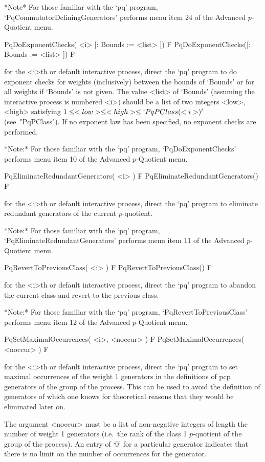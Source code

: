 \goodbreak%
*Note*
For those familiar with the `pq' program, `PqCommutatorDefiningGenerators'
performs menu item 24 of the Advanced $p$-Quotient menu.

\>PqDoExponentChecks( <i> [: Bounds := <list> ]) F
\>PqDoExponentChecks([: Bounds := <list> ]) F

for the  <i>th or  default interactive {\ANUPQ}  process, direct  the `pq'
program to do exponent checks for weights (inclusively) between the bounds
of `Bounds' or for all weights  if `Bounds' is not given. The value <list>
of `Bounds' (assuming the interactive process is numbered <i>) should be a
list of two integers <low>, <high>  satisfying $1 \le <low> \le <high> \le
`PqPClass(<i>)'$ (see~"PqPClass").  If no exponent law has been specified,
no exponent checks are performed.

*Note:*
For those familiar with the `pq'  program,  `PqDoExponentChecks'  performs
menu item 10 of the Advanced $p$-Quotient menu.

\>PqEliminateRedundantGenerators( <i> ) F
\>PqEliminateRedundantGenerators() F

for the <i>th or default interactive {\ANUPQ} process, direct  the  `pq'
program to eliminate redundant generators of the current $p$-quotient.

*Note:* 
For those familiar with the `pq' program, `PqEliminateRedundantGenerators'
performs menu item 11 of the Advanced $p$-Quotient menu.

\>PqRevertToPreviousClass( <i> ) F
\>PqRevertToPreviousClass() F

for the <i>th or default interactive {\ANUPQ} process, direct  the  `pq'
program to abandon the current class and revert to the previous class.

*Note:*
For  those  familiar  with  the  `pq'  program,  `PqRevertToPreviousClass'
performs menu item 12 of the Advanced $p$-Quotient menu.

\>PqSetMaximalOccurrences( <i>, <noccur> ) F
\>PqSetMaximalOccurrences( <noccur> ) F

for the  <i>th or default  interactive {\ANUPQ} process, direct  the `pq'
program  to set maximal  occurrences of  the weight  1 generators  in the
definitions of pcp  generators of the group of the  process.  This can be
used  to  avoid the  definition  of generators  of  which  one knows  for
theoretical reasons that they would be eliminated later on.

The argument <noccur>  must be a list of  non-negative integers of length
the  number  of  weight  1  generators  (i.e.~the rank  of  the  class  1
$p$-quotient  of  the group  of  the  process). An  entry  of  `0' for  a
particular generator  indicates that there is  no limit on  the number of
occurrences for the generator.


